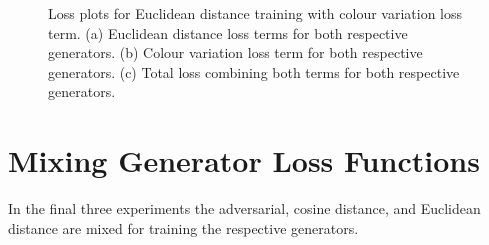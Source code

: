  \begin{figure}[!htbp]
    \centering
    \hfill
    \hfill
    \caption[Loss plots for Euclidean distance training with colour variation loss term]{Loss plots for Euclidean distance training with colour variation loss term. (a) Euclidean distance loss terms for both respective generators. (b) Colour variation loss term for both respective generators. (c) Total loss combining both terms for both respective generators. }
    \label{fig:c3:euclid-euclid-losses}
  \end{figure}

  \FloatBarrier

\section{Mixing Generator Loss Functions}

In the final three experiments the adversarial, cosine distance, and Euclidean distance are mixed for training the respective generators. 

